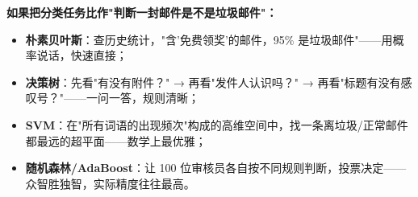 \documentclass[a4paper,11pt]{ctexart}
\begin{document}
\begin{metaphorbox}[给零基础读者的一句总比喻]
    \textbf{如果把分类任务比作"判断一封邮件是不是垃圾邮件"：}
    \begin{itemize}
        \item \textbf{朴素贝叶斯}：查历史统计，"含'免费领奖'的邮件，95\% 是垃圾邮件"——用概率说话，快速直接；
        \item \textbf{决策树}：先看"有没有附件？" → 再看"发件人认识吗？" → 再看"标题有没有感叹号？"——一问一答，规则清晰；
        \item \textbf{SVM}：在"所有词语的出现频次"构成的高维空间中，找一条离垃圾/正常邮件都最远的超平面——数学上最优雅；
        \item \textbf{随机森林/AdaBoost}：让 100 位审核员各自按不同规则判断，投票决定——众智胜独智，实际精度往往最高。
    \end{itemize}
\end{metaphorbox}
\end{document}
